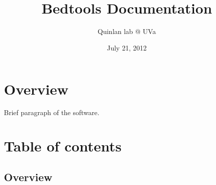 \documentclass[letterpaper,10pt,english]{sphinxmanual}
\title{Bedtools Documentation}
\date{July 21, 2012}
\author{Quinlan lab @ UVa}
\begin{document}
\maketitle
\tableofcontents
{}\label{index::doc}



\chapter{Overview}
\label{index:bedtools-a-powerful-toolset-for-genome-arithmetic}\label{index:overview}
Brief paragraph of the software.


\chapter{Table of contents}
\label{index:table-of-contents}

\section{Overview}
\label{content/overview:overview}\label{content/overview::doc}
\end{document}
